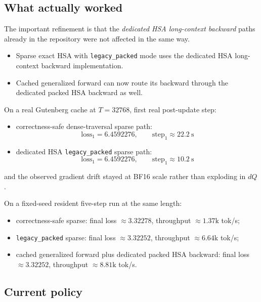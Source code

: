 \documentclass[11pt]{article}
\begin{document}
\subsection{What actually worked}

The important refinement is that the \emph{dedicated HSA long-context backward}
paths already in the repository were not affected in the same way.

\begin{itemize}[leftmargin=1.5em]
    \item Sparse exact HSA with \texttt{legacy\_packed} mode uses the dedicated
    HSA long-context backward implementation.
    \item Cached generalized forward can now route its backward through the
    dedicated packed HSA backward as well.
\end{itemize}

On a real Gutenberg cache at $T=32768$, first real post-update step:
\begin{itemize}[leftmargin=1.5em]
    \item correctness-safe dense-traversal sparse path:
    \[
    \text{loss}_1 = 6.4592276,\qquad \text{step}_1 \approx 22.2\ \mathrm{s}
    \]
    \item dedicated HSA \texttt{legacy\_packed} sparse path:
    \[
    \text{loss}_1 = 6.4592276,\qquad \text{step}_1 \approx 10.2\ \mathrm{s}
    \]
\end{itemize}
and the observed gradient drift stayed at BF16 scale rather than exploding in
$dQ$.

On a fixed-seed resident five-step run at the same length:
\begin{itemize}[leftmargin=1.5em]
    \item correctness-safe sparse:
    final loss $\approx 3.32278$,
    throughput $\approx 1.37\mathrm{k}$ tok/s;
    \item \texttt{legacy\_packed} sparse:
    final loss $\approx 3.32252$,
    throughput $\approx 6.64\mathrm{k}$ tok/s;
    \item cached generalized forward plus dedicated packed HSA backward:
    final loss $\approx 3.32252$,
    throughput $\approx 8.81\mathrm{k}$ tok/s.
\end{itemize}

\subsection{Current policy}
\end{document}
